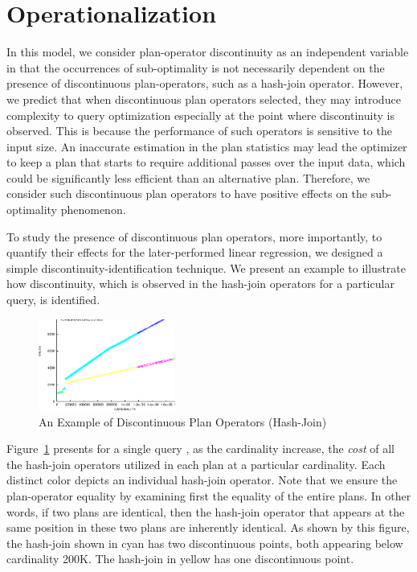 \section{Operationalization}
In this model, we consider plan-operator discontinuity as an independent 
variable in that the occurrences of sub-optimality is not necessarily dependent
on the presence of discontinuous plan-operators, such as a hash-join
operator. However, we predict that when discontinuous plan operators
selected, they may introduce complexity to query optimization especially
at the point where discontinuity is observed. This is because the performance
of such operators is sensitive to the input size. An inaccurate estimation
in the plan statistics may lead the optimizer to keep a plan that
starts to require additional passes over the input data, which could be
significantly less efficient than an alternative plan. Therefore,
we consider such discontinuous plan operators to have positive effects
on the sub-optimality phenomenon.

To study the presence of discontinuous plan operators, more importantly,
to quantify their effects for the later-performed linear regression,
we designed a simple discontinuity-identification technique. We present
an example to illustrate how discontinuity, which is observed in the hash-join
operators for a particular query, is identified.

\begin{figure}[th]\centering
\includegraphics[width=0.40\textwidth]{figures/discontinuity.eps}
\caption{An Example of Discontinuous Plan Operators (Hash-Join)
\label{fig:discontinuity}}
\end{figure}

Figure~\ref{fig:discontinuity} presents for a single query
, as the cardinality
increase, the {\em cost} of all the hash-join operators utilized in each
plan at a particular cardinality. Each distinct color depicts an individual
hash-join operator.
Note that we ensure the plan-operator equality by examining first the
equality of the entire plans. In other words, if two plans are identical,
then the hash-join operator that appears at the same position in these two
plans are inherently identical. As shown by this figure, the hash-join shown
in cyan has two discontinuous points, both appearing below cardinality
200K. The hash-join in yellow has one discontinuous point.

